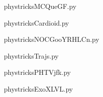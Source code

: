     \newcommand{\CaptionFigMCQueGF}{<+Type your caption here+>}
    \begin{center}
        
    \end{center}
    phystricksMCQueGF.py

    

    \clearpage
    


    \newcommand{\CaptionFigCardioid}{<+Type your caption here+>}
    \begin{center}
        
    \end{center}
    phystricksCardioid.py

    

    \clearpage
    


    \newcommand{\CaptionFigNOCGooYRHLCn}{<+Type your caption here+>}
    \begin{center}
        
    \end{center}
    phystricksNOCGooYRHLCn.py

    

    \clearpage
    


    \newcommand{\CaptionFigTrajs}{<+Type your caption here+>}
    \begin{center}
        
    \end{center}
    phystricksTrajs.py

    

    \clearpage
    


    \newcommand{\CaptionFigPHTVjfk}{<+Type your caption here+>}
    \begin{center}
        
    \end{center}
    phystricksPHTVjfk.py

    

    \clearpage
    


    \newcommand{\CaptionFigExoXLVL}{<+Type your caption here+>}
    \begin{center}
        
    \end{center}
    phystricksExoXLVL.py

